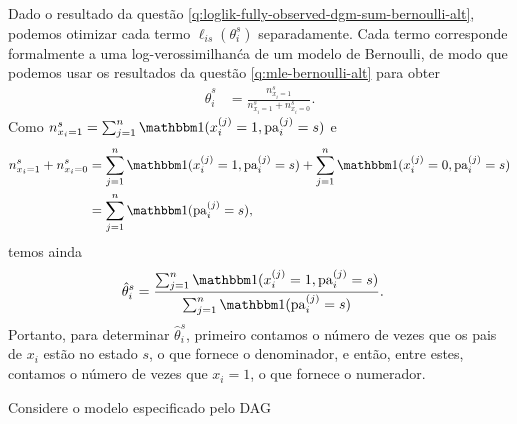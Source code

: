 \begin{exenumerate}
    \begin{solution}
        Dado o resultado da quest\~ao
        \ref{q:loglik-fully-observed-dgm-sum-bernoulli-alt}, podemos otimizar
        cada termo $\ell_{is}(\theta_i^s)$ separadamente. Cada termo
        corresponde formalmente a uma log-verossimilhan\'ca de um modelo de Bernoulli, de modo que
        podemos usar os resultados da quest\~ao \ref{q:mle-bernoulli-alt} para obter
        \begin{align}
            \hat{\theta}_i^s &= \frac{n_{x_i=1}^s}{n_{x_i=1}^s+n_{x_i=0}^s}.
        \end{align}
        Como $n_{x_i=1}^s = \sum_{j=1}^n\ind(x_i^{(j)}=1, \pa_i^{(j)}=s)$ e
        \begin{align}
            n_{x_i=1}^s+n_{x_i=0}^s &=  \sum_{j=1}^n\ind(x_i^{(j)}=1, \pa_i^{(j)}=s) +  \sum_{j=1}^n\ind(x_i^{(j)}=0, \pa_i^{(j)}=s)\\
            & =  \sum_{j=1}^n\ind( \pa_i^{(j)}=s),
        \end{align}
        temos ainda
        \begin{align}
            \hat{\theta}_i^s &= \frac{ \sum_{j=1}^n\ind(x_i^{(j)}=1, \pa_i^{(j)}=s) }{ \sum_{j=1}^n\ind(\pa_i^{(j)}=s) }.
            \label{eq:dag-table-mle-alt}
        \end{align}
        Portanto, para determinar $\hat{\theta}_i^s$, primeiro contamos o
        n\'umero de vezes que os pais de $x_i$ est\~ao no estado $s$, o que
        fornece o denominador, e ent\~ao, entre estes, contamos o n\'umero de
        vezes que $x_i=1$, o que fornece o numerador.
        
    \end{solution}
    
\end{exenumerate}


\label{ex:cancer-smoking-asbestos-mle-alt} 
Considere o modelo especificado pelo DAG

\begin{center}
\end{center}

